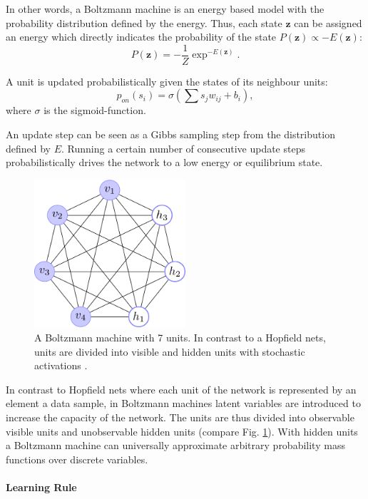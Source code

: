 In other words, a Boltzmann machine is an energy based model with the probability distribution defined by the energy.
Thus, each state $\textbf{z}$ can be assigned an energy which directly indicates the probability of the state $P(\textbf{z}) \propto -E(\textbf{z})$:
\[
P(\textbf{z}) = - \frac{1}{Z} \exp^{-E(\textbf{z})} .
\]

A unit is updated probabilistically given the states of its neighbour units:
\[
p_{on}(s_i) = \sigma( \sum s_j w_{ij} + b_i ), 
\]
where $\sigma$ is the sigmoid-function.

An update step can be seen as a Gibbs sampling step from the distribution defined by $E$.
Running a certain number of consecutive update steps probabilistically drives the network to a low energy or equilibrium state.


\begin{figure}
	\centering
    	\includegraphics[width=0.5\textwidth]{imgs/bm.png} 
    \caption[A Boltzmann machine with 7 units.]{A Boltzmann machine with 7 units. In contrast to a Hopfield nets, units are divided into visible and hidden units with stochastic activations \cite{boltzImg}.}
	\label{fig:bm}
\end{figure}

In contrast to Hopfield nets where each unit of the network is represented by an element a data sample, in Boltzmann machines latent variables are introduced to increase the capacity of the network.
The units are thus divided into observable visible units and unobservable hidden units (compare Fig. \ref{fig:bm}).
With hidden units a Boltzmann machine can universally approximate arbitrary probability mass functions over discrete variables.


\paragraph{Learning Rule} \label{c:cd}

